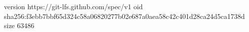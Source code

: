 version https://git-lfs.github.com/spec/v1
oid sha256:f3ebb7bbf65d324c58a06820277b02e687a0aea58c42c401d28ca24d5ca1738d
size 63486
